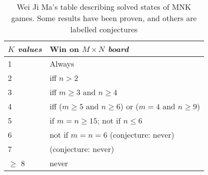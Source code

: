 \begin{table}
\begin{tabular}{@{}l|l}
\emph{\textbf{$K$ values}} & Win on \emph{\textbf{$ M \times N$ board}} \\
\hline
1 & Always\\
\hline
2 &  iff $n > 2$\\
\hline
3 &  iff $m \geq 3$ and $n \geq 4$\\
\hline
4 & iff ($m \geq 5$ and $n \geq 6$) or ($m = 4$ and $n \geq 9$)\\
\hline
5 & if $m = n \geq 15$; not if $n \leq 6$ \\
\hline
6 & not if $m = n = 6$ (conjecture: never)\\
\hline
7 & (conjecture: never)\\
\hline
$\geq$ 8 & never \\
\end{tabular}
\caption{Wei Ji Ma's table describing solved states of MNK games.
Some results have been proven, and others are labelled conjectures}
\label{tab:weiJiMa}
\end{table}